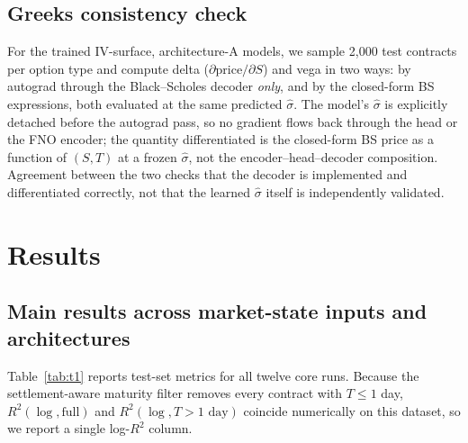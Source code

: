 \documentclass[11pt]{article}
\begin{document}
\subsection{Greeks consistency check}
\label{sec:greeks-method}
For the trained IV-surface, architecture-A models, we sample 2{,}000 test contracts per option type and
compute delta ($\partial \text{price}/\partial S$) and vega in two ways: by autograd through the
Black--Scholes decoder \emph{only}, and by the closed-form BS expressions, both evaluated at the same
predicted $\hat\sigma$. The model's $\hat\sigma$ is explicitly detached before the autograd pass, so no
gradient flows back through the head or the FNO encoder; the quantity differentiated is the closed-form
BS price as a function of $(S, T)$ at a frozen $\hat\sigma$, not the encoder--head--decoder
composition. Agreement between the two checks that the decoder is implemented and differentiated
correctly, not that the learned $\hat\sigma$ itself is independently validated.

\section{Results}
\label{sec:results}

\subsection{Main results across market-state inputs and architectures}
\label{sec:results-branch}
Table~\ref{tab:t1} reports test-set metrics for all twelve core runs. Because the settlement-aware
maturity filter removes every contract with $T \leq 1$ day, $R^2(\log, \text{full})$ and $R^2(\log,
T{>}1\text{ day})$ coincide numerically on this dataset, so we report a single log-$R^2$ column.
\end{document}
